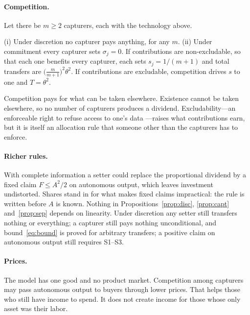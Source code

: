 \paragraph{Competition.} Let there be $m\ge 2$ capturers, each with the technology above.

\begin{proposition}[Competition]\label{prop:comp}
(i) Under discretion no capturer pays anything, for any $m$. (ii) Under commitment every
capturer sets $\sigma_j=0$. If contributions are non-excludable, so that each one benefits
every capturer, each sets $s_j=1/(m+1)$ and total transfers are
$\bigl(\tfrac{m}{m+1}\bigr)^2\theta^2$. If contributions are excludable, competition
drives $s$ to one and $T=\theta^2$.
\end{proposition}

Competition pays for what can be taken elsewhere. Existence cannot be taken elsewhere, so
no number of capturers produces a dividend. Excludability---an enforceable right to refuse
access to one's data \citep{ArrietaIbarra2018,JonesTonetti2020}---raises what
contributions earn, but it is itself an allocation rule that someone other than the
capturers has to enforce.

\paragraph{Richer rules.} With complete information a setter could replace the
proportional dividend by a fixed claim $F\le A^2/2$ on autonomous output, which leaves
investment undistorted. Shares stand in for what makes fixed claims impractical: the rule
is written before $A$ is known. Nothing in Propositions~\ref{prop:disc}, \ref{prop:capt}
and~\ref{prop:sep} depends on linearity. Under discretion any setter still transfers
nothing or everything; a capturer still pays nothing unconditional, and
bound~\eqref{eq:bound} is proved for arbitrary transfers; a positive claim on autonomous
output still requires S1--S3.

\paragraph{Prices.} The model has one good and no product market. Competition among
capturers may pass autonomous output to buyers through lower prices. That helps those who
still have income to spend. It does not create income for those whose only asset was
their labor.

